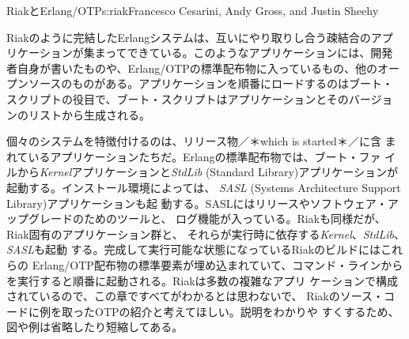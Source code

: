 \begin{aosachapter}{RiakとErlang/OTP}{s:riak}{Francesco Cesarini, Andy Gross, and Justin Sheehy}

Riakのように完結したErlangシステムは、互いにやり取りし合う疎結合のアプ
リケーションが集まってできている。このようなアプリケーションには、開発
者自身が書いたものや、Erlang/OTPの標準配布物に入っているもの、他のオー
プンソースのものがある。アプリケーションを順番にロードするのはブート・
スクリプトの役目で、ブート・スクリプトはアプリケーションとそのバージョ
ンのリストから生成される。



個々のシステムを特徴付けるのは、リリース物／＊which is started＊／に含
まれているアプリケーションたちだ。Erlangの標準配布物では、ブート・ファ
イルから\emph{Kernel}アプリケーションと\emph{StdLib} (Standard
Library)アプリケーションが起動する。インストール環境によっては、
\emph{SASL} (Systems Architecture Support Library)アプリケーションも起
動する。SASLにはリリースやソフトウェア・アップグレードのためのツールと、
ログ機能が入っている。Riakも同様だが、Riak固有のアプリケーション群と、
それらが実行時に依存する\emph{Kernel}、\emph{StdLib}、\emph{SASL}も起動
する。完成して実行可能な状態になっているRiakのビルドにはこれらの
Erlang/OTP配布物の標準要素が埋め込まれていて、コマンド・ラインから
を実行すると順番に起動される。Riakは多数の複雑なアプリ
ケーションで構成されているので、この章ですべてがわかるとは思わないで、
Riakのソース・コードに例を取ったOTPの紹介と考えてほしい。説明をわかりや
すくするため、図や例は省略したり短縮してある。


\end{aosachapter}
